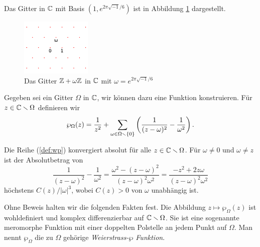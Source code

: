 \begin{beispiel}
  Das Gitter in ${\mathbb{C}}$ mit Basis $(1,e^{2\pi
    \sqrt{-1}/6})$
  ist in Abbildung
  \ref{fig:lattice} dargestellt. 
  \begin{figure}
    \centering    
    \caption{Das Gitter ${\mathbb{Z}}+\omega{\mathbb{Z}}$ in ${\mathbb{C}}$ mit $\omega = e^{2\pi\sqrt{-1}/6}$}
    \label{fig:lattice}
    \includegraphics[width=0.3\textwidth]{./plots/lattice.png}
  \end{figure}
\end{beispiel}

Gegeben sei ein Gitter $\Omega$ in ${\mathbb{C}}$, wir können dazu eine Funktion
konstruieren. Für $z\in {\mathbb{C}}\smallsetminus\Omega$ definieren wir
\begin{equation}
  \label{def:wp}
  \wp_\Omega(z) = \frac{1}{z^2} + \sum_{\omega\in \Omega\smallsetminus\{0\}}
  \left(\frac{1}{(z-\omega)^2} - \frac{1}{\omega^2}\right).
\end{equation}

\begin{bemerkung}
  Die Reihe (\ref{def:wp}) konvergiert absolut für alle
  $z\in{\mathbb{C}}\smallsetminus\Omega$.
  Für $\omega\not=0$ und
  $\omega\not=z$ ist der
  Absolutbetrag von 
  \begin{equation*}
    \frac{1}{(z-\omega)^2} - \frac{1}{\omega^2} =
    \frac{\omega^2 - (z-\omega)^2}{(z-\omega)^2\omega^2}
    =\frac{-z^2 + 2z\omega}{(z-\omega)^2\omega^2}
  \end{equation*}
  höchstens $C(z)/|\omega|^3$, wobei $C(z)>0$ von $\omega$ unabhängig
  ist. 
\end{bemerkung}

Ohne Beweis halten wir die folgenden Fakten fest.
Die Abbildung $z\mapsto \wp_\Omega(z)$ ist wohldefiniert und komplex
differenzierbar auf ${\mathbb{C}}\smallsetminus\Omega$. Sie ist eine sogenannte meromorphe Funktion
mit einer doppelten Polstelle an jedem Punkt auf $\Omega$. 
Man nennt $\wp_\Omega$ die zu $\Omega$ gehörige \emph{Weierstrass-$\wp$
  Funktion}.

